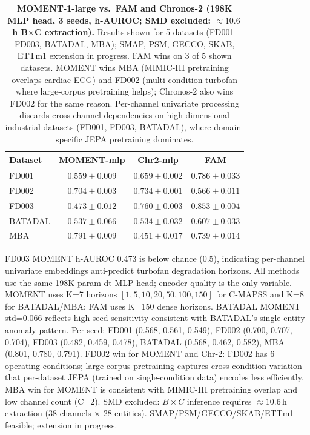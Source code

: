 \documentclass{article}
\begin{document}
\begin{table}[h]
  \centering
  \caption{\textbf{MOMENT-1-large vs.\ FAM and Chronos-2 (198K MLP head, 3 seeds, h-AUROC; SMD excluded: ${\approx}10.6$\,h B${\times}$C extraction).} Results shown for 5 datasets (FD001-FD003, BATADAL, MBA); SMAP, PSM, GECCO, SKAB, ETTm1 extension in progress. FAM wins on 3 of 5 shown datasets. MOMENT wins MBA (MIMIC-III pretraining overlaps cardiac ECG) and FD002 (multi-condition turbofan where large-corpus pretraining helps); Chronos-2 also wins FD002 for the same reason. Per-channel univariate processing discards cross-channel dependencies on high-dimensional industrial datasets (FD001, FD003, BATADAL), where domain-specific JEPA pretraining dominates.}
  \label{tab:moment_full}
  \small
  \begin{tabular}{lccc}
    \toprule
    Dataset & MOMENT-mlp                 & Chr2-mlp                   & FAM                        \\
    \midrule
    FD001   & $0.559 \pm 0.009$          & $0.659 \pm 0.002$          & $\mathbf{0.786 \pm 0.033}$ \\
    FD002   & $0.704 \pm 0.003$          & $\mathbf{0.734 \pm 0.001}$ & $0.566 \pm 0.011$          \\
    FD003   & $0.473 \pm 0.012$          & $0.760 \pm 0.003$          & $\mathbf{0.853 \pm 0.004}$ \\
    BATADAL & $0.537 \pm 0.066$          & $0.534 \pm 0.032$          & $\mathbf{0.607 \pm 0.033}$ \\
    MBA     & $\mathbf{0.791 \pm 0.009}$ & $0.451 \pm 0.017$          & $0.739 \pm 0.014$          \\
    \bottomrule
  \end{tabular}
  \vspace{2pt}
  \begin{minipage}{\linewidth}
    \scriptsize
    FD003 MOMENT h-AUROC 0.473 is below chance (0.5), indicating per-channel univariate embeddings anti-predict turbofan degradation horizons. All methods use the same 198K-param dt-MLP head; encoder quality is the only variable. MOMENT uses K=7 horizons $[1,5,10,20,50,100,150]$ for C-MAPSS and K=8 for BATADAL/MBA; FAM uses K=150 dense horizons. BATADAL MOMENT std=0.066 reflects high seed sensitivity consistent with BATADAL's single-entity anomaly pattern. Per-seed: FD001 (0.568, 0.561, 0.549), FD002 (0.700, 0.707, 0.704), FD003 (0.482, 0.459, 0.478), BATADAL (0.568, 0.462, 0.582), MBA (0.801, 0.780, 0.791). FD002 win for MOMENT and Chr-2: FD002 has 6 operating conditions; large-corpus pretraining captures cross-condition variation that per-dataset JEPA (trained on single-condition data) encodes less efficiently. MBA win for MOMENT is consistent with MIMIC-III pretraining overlap and low channel count (C=2). SMD excluded: $B{\times}C$ inference requires ${\approx}10.6$\,h extraction (38 channels $\times$ 28 entities). SMAP/PSM/GECCO/SKAB/ETTm1 feasible; extension in progress.
  \end{minipage}
\end{table}
\end{document}
